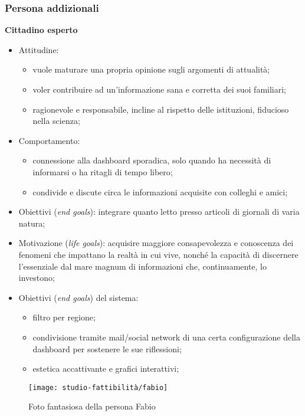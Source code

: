 \subsubsection*{Persona addizionali}
\textbf{Cittadino esperto}
	\begin{itemize}
	\item Attitudine:
    \begin{itemize}
        \item vuole maturare una propria opinione sugli argomenti di attualità;
        \item voler contribuire ad un'informazione sana e corretta dei suoi familiari;
        \item ragionevole e responsabile, incline al rispetto delle istituzioni, fiducioso nella scienza;
    \end{itemize}
	\item Comportamento: 
    \begin{itemize}
        \item connessione alla dashboard sporadica, solo quando ha necessità di informarsi o ha ritagli di tempo libero;
        \item condivide e discute circa le informazioni acquisite con colleghi e amici;
    \end{itemize}
    \item Obiettivi (\textit{end goals}): integrare quanto letto presso articoli di giornali di varia natura;
    \item Motivazione (\textit{life goals}): acquisire maggiore consapevolezza e conoscenza dei fenomeni che impattano la realtà in cui vive, nonché la capacità di discernere l'essenziale dal mare magnum di informazioni che, continuamente, lo investono;
    \item Obiettivi (\textit{end goals}) del sistema:
    \begin{itemize}
        \item filtro per regione;
        \item condivisione tramite mail/social network di una certa configurazione della dashboard per sostenere le sue riflessioni;
        \item estetica accattivante e grafici interattivi;
    \end{itemize}
\end{itemize}

\begin{wrapfigure}{r}{8cm}
    \texttt{[image: studio-fattibilità/fabio]}
    \caption{Foto fantasiosa della persona Fabio}
\end{wrapfigure}


